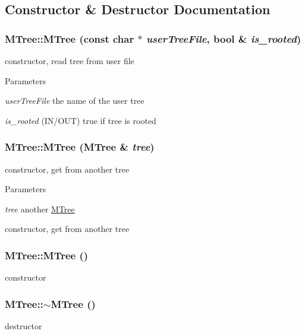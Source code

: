 \subsection{Constructor \& Destructor Documentation}
\hypertarget{classMTree_ac3f7f958f638616e0728cb8e2b865922}{
\subsubsection[{MTree}]{\setlength{\rightskip}{0pt plus 5cm}MTree::MTree (const char $\ast$ {\em userTreeFile}, \/  bool \& {\em is\_\-rooted})}}
\label{classMTree_ac3f7f958f638616e0728cb8e2b865922}
constructor, read tree from user file 
\begin{DoxyParams}{Parameters}
\item[{\em userTreeFile}]the name of the user tree \item[{\em is\_\-rooted}](IN/OUT) true if tree is rooted \end{DoxyParams}
\hypertarget{classMTree_aa5d236fb4f1f1fbead1d167675c236c6}{
\subsubsection[{MTree}]{\setlength{\rightskip}{0pt plus 5cm}MTree::MTree ({\bf MTree} \& {\em tree})}}
\label{classMTree_aa5d236fb4f1f1fbead1d167675c236c6}
constructor, get from another tree 
\begin{DoxyParams}{Parameters}
\item[{\em tree}]another \hyperlink{classMTree}{MTree}\end{DoxyParams}
constructor, get from another tree \hypertarget{classMTree_aa6a5b154429fee7f9507f8fadce1fe95}{
\subsubsection[{MTree}]{\setlength{\rightskip}{0pt plus 5cm}MTree::MTree ()}}
\label{classMTree_aa6a5b154429fee7f9507f8fadce1fe95}
constructor \hypertarget{classMTree_ab56a0aa9ff7ee51f3b2352a0e80ca973}{
\subsubsection[{$\sim$MTree}]{\setlength{\rightskip}{0pt plus 5cm}MTree::$\sim$MTree ()}}
\label{classMTree_ab56a0aa9ff7ee51f3b2352a0e80ca973}
destructor 

